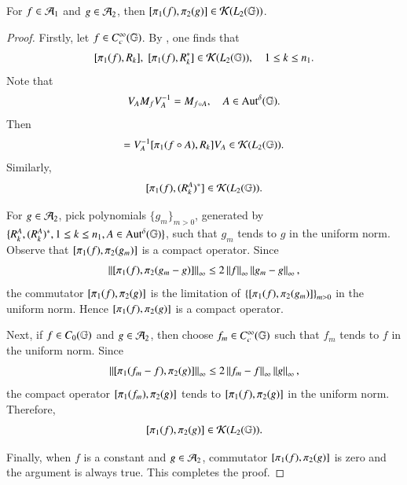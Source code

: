 \documentclass[leqno]{amsart}
\begin{document}
	\begin{lemma}\label{compactness}
		For $f\in{\mathcal A}_{1}$ and $g\in{\mathcal A}_{2}$, then $[\pi_{1}(f),\pi_{2}(g)]\in{\mathcal K}(L_{2}(\mathbb{G}))$.
	\end{lemma}
	\begin{proof}
		Firstly, let $f\in C_{c}^{\infty}(\mathbb{G})$.
		By \cite{CDLW2019}, one finds that
		$$[\pi_{1}(f),{ R}_{k}],\; [\pi_{1}(f),{ R}_{k}^{*}]\in{\mathcal K}(L_{2}(\mathbb{G})),\quad 1\leq k\leq n_{1}.$$
		Note that 
		\begin{align*}
			V_{A}M_{f} V_{A}^{-1}=M_{f\circ A},\quad A\in{\rm Aut^{\delta}}(\mathbb{G}).
		\end{align*}
		Then
		\begin{align*}
			[\po(f),\quasiriesz{A}{k}]=V_{A}\rp[\po(f\circ A),\R_{k}]V_{A}\in\K(\lp{2}).
		\end{align*}
		Similarly, $$[\pi_{1}(f),({ R}^{A}_{k})^{*}]\in{\mathcal K}(L_{2}(\mathbb{G})).$$
		
		For $g\in{\mathcal A}_{2}$, pick polynomials $\{g_{m}\}_{m>0}$, generated by $\{{ R}^{A}_{k},({ R}^{A}_{k})^{*},1\leq k\leq n_{1},A\in{\rm Aut^{\delta}}(\mathbb{G})\}$, such that $g_{m}$ tends to $g$ in the uniform norm. Observe that $[\pi_{1}(f),\pi_{2}(g_{m})]$ is a compact operator. Since
		\begin{align*}
			\left\| [\pi_{1}(f),\pi_{2}(g_{m}-g)] \right\|_{\infty}\leq2\left\| f \right\|_{\infty}\left\| g_{m}-g \right\|_{\infty},
		\end{align*}
		the commutator $[\pi_{1}(f),\pi_{2}(g)]$ is the limitation of $\left\{ [\pi_{1}(f),\pi_{2}(g_{m})] \right\}_{m>0}$ in the uniform norm. Hence $[\pi_{1}(f),\pi_{2}(g)]$ is a compact operator.
		
		Next, if $f\in C_{0}(\mathbb{G})$ and $g\in{\mathcal A}_{2}$, then choose $f_{m}\in C_{c}^{\infty}(\mathbb{G})$ such that $f_{m}$ tends to $f$ in the uniform norm. Since
		\begin{align*}
			\left\| [\pi_{1}(f_{m}-f),\pi_{2}(g)] \right\|_{\infty}\leq2\left\| f_{m}-f \right\|_{\infty}\left\| g \right\|_{\infty},
		\end{align*}
		the compact operator $[\pi_{1}(f_{m}),\pi_{2}(g)]$ tends to $[\pi_{1}(f),\pi_{2}(g)]$ in the uniform norm. Therefore, $$[\pi_{1}(f),\pi_{2}(g)]\in{\mathcal K}(L_{2}(\mathbb{G})).$$
		
		Finally, when $f$ is a constant and $g\in{\mathcal A}_{2}$, commutator $[\pi_{1}(f),\pi_{2}(g)]$ is zero and the argument is always true. This completes the proof.
	\end{proof}
	
	
	
	\medskip
	
\end{document}
